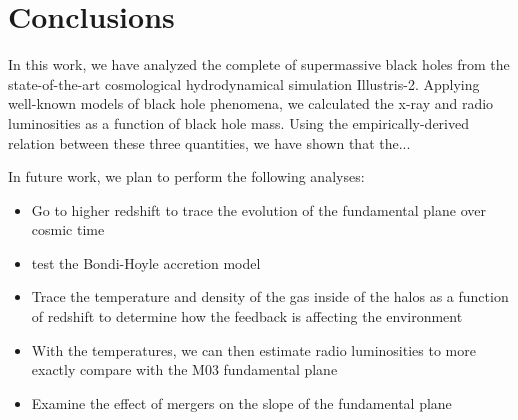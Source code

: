 \section{Conclusions}

\label{sec:conclusions}In this work, we have analyzed the complete
of supermassive black holes from the state-of-the-art cosmological
hydrodynamical simulation Illustris-2. Applying well-known models
of black hole phenomena, we calculated the x-ray and radio luminosities
as a function of black hole mass. Using the empirically-derived relation
between these three quantities, we have shown that the...

In future work, we plan to perform the following analyses:
\begin{itemize}
\item Go to higher redshift to trace the evolution of the fundamental plane
over cosmic time
\item test the Bondi-Hoyle accretion model
\item Trace the temperature and density of the gas inside of the halos as
a function of redshift to determine how the feedback is affecting
the environment
\item With the temperatures, we can then estimate radio luminosities to
more exactly compare with the M03 fundamental plane
\item Examine the effect of mergers on the slope of the fundamental plane\end{itemize}
